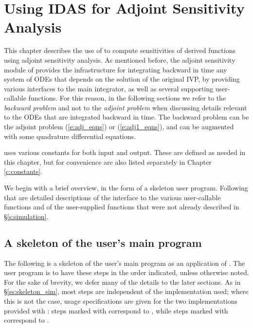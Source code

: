 \chapter{Using IDAS for Adjoint Sensitivity Analysis}\label{s:adjoint}

This chapter describes the use of {\idas} to compute sensitivities of derived 
functions using adjoint sensitivity analysis. As mentioned before, the adjoint
sensitivity module of {\idas} provides the infrastructure for integrating
backward in time any system of ODEs that depends on the solution of the original
IVP, by providing various interfaces to the main {\idas} integrator, as well 
as several supporting user-callable functions. For this reason, in the following
sections we refer to the {\em backward problem} and not to the 
{\em adjoint problem} when discussing details relevant to the ODEs that
are integrated backward in  time. The backward problem can be the adjoint problem
(\ref{e:adj_eqns}) or (\ref{e:adj1_eqns}), and
can be augmented with some quadrature differential equations.

{\idas} uses various constants for both input and output.  These are
defined as needed in this chapter, but for convenience are also listed
separately in Chapter \ref{c:constants}.

We begin with a brief overview, in the form of a skeleton user program.
Following that are detailed descriptions of the interface to the
various user-callable functions and of the user-supplied functions that were not already
described in \S\ref{s:simulation}.

\section{A skeleton of the user's main program}
\label{ss:skeleton_adj}

The following is a skeleton of the user's main program as an application of
{\idas}. The user program is to have these steps in the order indicated, 
unless otherwise noted. For the sake of brevity, we defer many of the details to 
the later sections.
As in \S\ref{ss:skeleton_sim}, most steps are independent of the {\nvector}
implementation used; where this is not the case, usage specifications are given for the
two implementations provided with {\idas}: steps marked with {\p} correspond to 
{\nvecp}, while steps marked with {\s} correspond to {\nvecs}.

